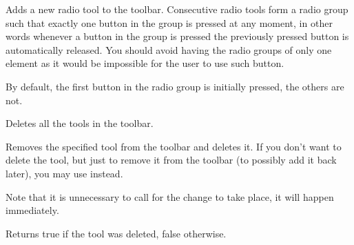 


\label{wxtoolbaraddradiotool}


Adds a new radio tool to the toolbar. Consecutive radio tools form a radio
group such that exactly one button in the group is pressed at any moment, in
other words whenever a button in the group is pressed the previously pressed
button is automatically released. You should avoid having the radio groups of
only one element as it would be impossible for the user to use such button.

By default, the first button in the radio group is initially pressed, the
others are not.



\label{wxtoolbarcleartools}


Deletes all the tools in the toolbar.

\label{wxtoolbardeletetool}


Removes the specified tool from the toolbar and deletes it. If you don't want
to delete the tool, but just to remove it from the toolbar (to possibly add it
back later), you may use  instead.

Note that it is unnecessary to call  for the
change to take place, it will happen immediately.

Returns true if the tool was deleted, false otherwise.




\label{wxtoolbardeletetoolbypos}

